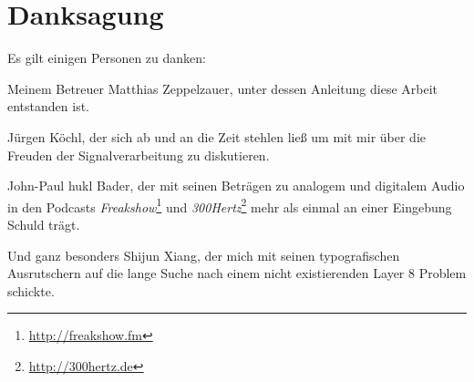 \chapter*{Danksagung}

\noindent Es gilt einigen Personen zu danken:

\vspace{6mm}

\noindent Meinem Betreuer Matthias Zeppelzauer, unter dessen Anleitung diese Arbeit entstanden ist.

\vspace{6mm}

\noindent J\"urgen K\"ochl, der sich ab und an die Zeit stehlen lie{\ss} um mit mir über die Freuden der Signalverarbeitung zu diskutieren.

\vspace{6mm}

\noindent John-Paul \glqq hukl\grqq{} Bader, der mit seinen Betr\"agen zu analogem und digitalem Audio in den Podcasts \emph{Freakshow}\footnote{\url{http://freakshow.fm}} und \textit{300Hertz}\footnote{\url{http://300hertz.de}} mehr als einmal an einer Eingebung Schuld tr\"agt. 

\vspace{6mm}

\noindent Und ganz besonders Shijun Xiang, der mich mit seinen typografischen Ausrutschern auf die lange Suche nach einem nicht existierenden Layer 8 Problem schickte.   
